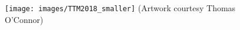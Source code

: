 %
%
%


\clearpage
\thispagestyle{empty}
\begin{figure}[h!]
	\centering
	\texttt{[image: images/TTM2018\_smaller]}
    \small
    (Artwork courtesy Thomas O'Connor)
\end{figure}
